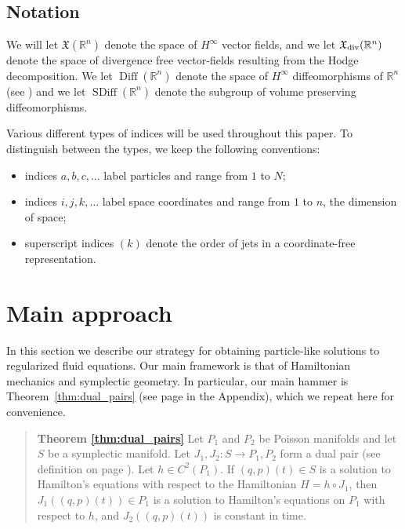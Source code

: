 \documentclass[12pt]{amsart}
\newcommand{\R}{\ensuremath{\mathbb{R}}}
\DeclareMathOperator{\SDiff}{SDiff}
\DeclareMathOperator{\Diff}{Diff}
\begin{document}
\subsection{Notation}
We will let $\mathfrak{X}(\R^n)$ denote the space of $H^\infty$ vector fields,
and we let $\mathfrak{X}_{\rm div}(\R^n)$
denote the space of divergence free vector-fields resulting from the Hodge decomposition.
We let $\Diff(\R^n)$ denote the space of $H^\infty$ diffeomorphisms of $\R^n$  (see \cite{MichorMumford2013})
and we let $\SDiff(\R^n)$ denote the subgroup of volume preserving diffeomorphisms.

Various different types of indices will be used throughout this paper.
To distinguish between the types, we keep the following
conventions:
\begin{itemize}
\item indices $a,b,c,\ldots$ label particles and range from $1$ to $N$;
\item indices $i,j,k,\ldots$ label space coordinates and range from
  $1$ to $n$, the dimension of space;
\item superscript indices $(k)$ denote the order of jets in a
  coordinate-free representation.
\end{itemize}

\section{Main approach}
\label{sec:approach}
In this section we describe our strategy for obtaining
particle-like solutions to regularized fluid equations.
Our main framework is that of Hamiltonian mechanics
and symplectic geometry.
In particular, our main hammer is Theorem~\ref{thm:dual_pairs} (see page
\pageref{thm:dual_pairs} in the Appendix), which we repeat
here for convenience.
  \begin{quote}
    {\bf Theorem \ref{thm:dual_pairs}}
    Let $P_1$ and $P_2$ be Poisson manifolds and let $S$ be
    a symplectic manifold.  Let $J_1,J_2:S \to P_1,P_2$ form a dual pair 
    (see definition on page \pageref{thm:dual_pairs}).
    Let $h \in C^2(P_1)$.
    If $(q,p)(t) \in S$ is a solution to Hamilton's equations
    with respect to the Hamiltonian $H = h \circ J_1$,
    then $J_1\left( (q,p)(t) \right) \in P_1$ is a solution
    to Hamilton's equations on $P_1$ with respect to $h$,
    and $J_2( (q,p)(t))$ is constant in time.
  \end{quote}
\end{document}
